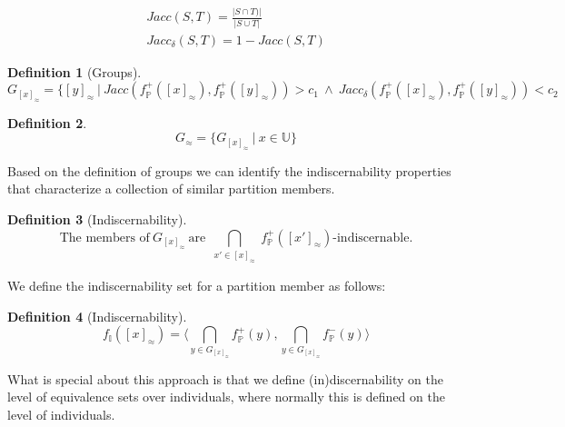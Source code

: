 \documentclass[11pt,a4paper,notitlepage,onecolumn,twoside]{article}
\newtheorem{definition}{Definition}
\begin{document}
\begin{align}
Jacc(S, T) = \frac{\vert S \cap T) \vert}{\vert S \cup T \vert} \\
Jacc_{\delta}(S, T) = 1 - Jacc(S, T)
\end{align}

\begin{definition}[Groups]
\begin{equation}
G_{[x]_{\approx}} = \{ [y]_{\approx} \  \vert \ 
  Jacc(f^{+}_{\mathbb{P}}([x]_{\approx}), f^{+}_{\mathbb{P}}([y]_{\approx})) > c_1
  \  \land \ 
  Jacc_{\delta}(f^{+}_{\mathbb{P}}([x]_{\approx}), f^{+}_{\mathbb{P}}([y]_{\approx})) < c_2
\end{equation}
\end{definition}

\begin{definition}
\begin{equation}
G_{\approx} = \{ G_{[x]_{\approx}} \  \vert \  x \in \mathbb{U} \}
\end{equation}
\end{definition}

Based on the definition of groups we can identify the indiscernability
properties that characterize a collection of similar partition members.

\begin{definition}[Indiscernability]
\begin{equation}
\text{The members of} \  G_{[x]_{\approx}} \  \text{are} \ 
  \underset{
    \substack{x' \in [x]_{\approx}}
  }{
    \operatorname{\bigcap}
  }
  f^{+}_{\mathbb{P}}([x']_{\approx})
  \text{-indiscernable}.
\end{equation}
\end{definition}

We define the indiscernability set for a partition member as follows:

\begin{definition}[Indiscernability]
\begin{equation}
f_{\mathbb{I}}([x]_{\approx}) =
  \langle
    \bigcap_{y \in G_{[x]_{\approx}}} f^{+}_{\mathbb{P}}(y),
    \bigcap_{y \in G_{[x]_{\approx}}} f^{-}_{\mathbb{P}}(y)
  \rangle
\end{equation}
\end{definition}

What is special about this approach is that we define (in)discernability on
the level of equivalence sets over individuals,
where normally this is defined on the level of individuals.
\end{document}
